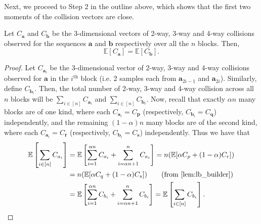 \documentclass[10pt]{article} %
\newcommand{\E}{\mathbb{E}}
\theoremstyle{plain}
\newcommand{\bp}{\textbf{p}}
\newcommand{\bq}{\textbf{q}}
\newcommand{\br}{\textbf{r}}
\newcommand{\bs}{\textbf{s}}
\newcommand{\ba}{\textbf{a}}
\newcommand{\bb}{\textbf{b}}
\begin{document}
Next, we proceed to Step 2 in the outline above, which shows that the first two moments of the collision vectors are close.

\begin{claim}
	\label{claim:exp_match}
	Let $C_{\ba}$ and $C_{\bb}$  be the 3-dimensional vectors of 2-way, 3-way and 4-way collisions observed for the sequences $\ba$ and $\bb$ respectively over all the $n$ blocks. Then,
	$$
	\E\left[C_{\ba}\right] = \E\left[C_{\bb}\right].
	$$
\end{claim}
\begin{proof}
	Let $C_{\ba_i}$ be the 3-dimensional vector of 2-way, 3-way and 4-way collisions observed for $\ba$ in the $i^{\text{th}}$ block (i.e. 2 samples each from $\ba_{2i-1}$ and $\ba_{2i}$). Similarly, define $C_{\bb_i}$. Then, the total number of 2-way, 3-way and 4-way collision across all $n$ blocks will be $\sum_{i \in [n]}C_{\ba_i}$ and $\sum_{i \in [n]}C_{\bb_i}$. Now, recall that exactly $\alpha n$ many blocks are of one kind, where each $C_{\ba_i}=C_{\bp}$ (respectively, $C_{\bb_i}=C_{\bq}$) independently, and the remaining $(1-\alpha)n$ many blocks are of the second kind, where each $C_{\ba_i}=C_{\br}$ (respectively, $C_{\bb_i}=C_{\bs}$) independently. Thus we have that
	\begin{align*}
		\E\left[\sum_{i \in [n]}C_{\ba_i}\right] &= \E\left[\sum_{i=1}^{\alpha n}C_{\ba_i} + \sum_{i=\alpha n + 1}^{n} C_{\ba_i}\right]
		= n(\E[\alpha C_{\bp} + (1-\alpha)C_{\br}]) \\& = n(\E[\alpha C_{\bq} + (1-\alpha) C_{\bs}]) \qquad \text{(from \Cref{lem:lb_builder})} \\
		&= \E\left[\sum_{i=1}^{\alpha n}C_{\bb_i} + \sum_{i=\alpha n + 1}^{n} C_{\bb_i}\right] = \E\left[\sum_{i \in [n]}C_{\bb_i}\right].
	\end{align*}
\end{proof} 
\end{document}
